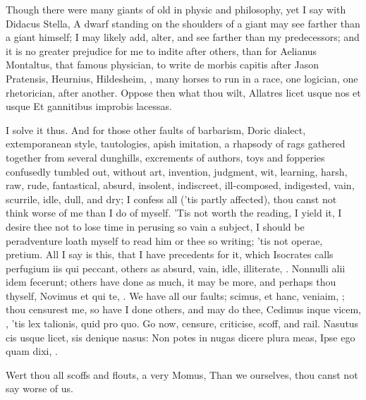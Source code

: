 {Though there were many giants of old in physic and philosophy, yet I
say with Didacus Stella, A dwarf standing on the shoulders of a
giant may see farther than a giant himself; I may likely add, alter,
and see farther than my predecessors; and it is no greater prejudice
for me to indite after others, than for Aelianus Montaltus, that famous
physician, to write de morbis capitis after Jason Pratensis, Heurnius,
Hildesheim, \etc, many horses to run in a race, one logician, one
rhetorician, after another. Oppose then what thou wilt,
Allatres licet usque nos et usque
Et gannitibus improbis lacessas.

I solve it thus. And for those other faults of barbarism, Doric
dialect, extemporanean style, tautologies, apish imitation, a rhapsody
of rags gathered together from several dunghills, excrements of
authors, toys and fopperies confusedly tumbled out, without art,
invention, judgment, wit, learning, harsh, raw, rude, fantastical,
absurd, insolent, indiscreet, ill-composed, indigested, vain, scurrile,
idle, dull, and dry; I confess all ('tis partly affected), thou canst
not think worse of me than I do of myself. 'Tis not worth the reading,
I yield it, I desire thee not to lose time in perusing so vain a
subject, I should be peradventure loath myself to read him or thee so
writing; 'tis not operae, pretium. All I say is this, that I have
precedents for it, which Isocrates calls perfugium iis qui
peccant, others as absurd, vain, idle, illiterate, \etc. Nonnulli alii
idem fecerunt; others have done as much, it may be more, and perhaps
thou thyself, Novimus et qui te, \etc. We have all our faults; scimus, et
hanc, veniaim, \etc; thou censurest me, so have I done others, and
may do thee, Cedimus inque vicem, \etc, 'tis lex talionis, quid pro quo.
Go now, censure, criticise, scoff, and rail.
Nasutus cis usque licet, sis denique nasus:
Non potes in nugas dicere plura meas,
Ipse ego quam dixi, \etc.

Wert thou all scoffs and flouts, a very Momus,
Than we ourselves, thou canst not say worse of us.

}
